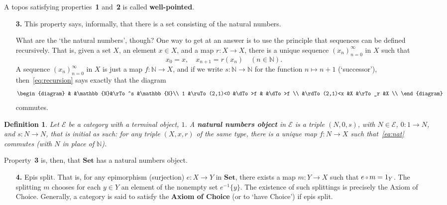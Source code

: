 \documentclass[12pt]{article}
\newcommand{\cat}[1]{\mathscr{#1}}
\newcommand{\fcat}[1]{\mathbf{#1}}
\newcommand{\Set}{\fcat{Set}}
\newcommand{\demph}[1]{\textbf{\textup{#1}}}
\newcommand{\nat}{\mathbb{N}}
\newcommand{\of}{\,\raisebox{0.08ex}{\ensuremath{\scriptstyle\circ}}\,}
\newcommand{\E}{\cat{E}}
\newcommand{\cln}{\colon}
\newtheorem{predefn}[thm]{Definition}
\newenvironment{defn}{\begin{predefn}\upshape}{\end{predefn}}
\begin{document}
A topos satisfying properties~\textbf{1} and~\textbf{2} is called
\demph{well-pointed}.  

\begin{enumerate}
\item[\textbf{3.}] 
This property says, informally, that there is a set consisting of the natural
numbers. 

What are the `the natural numbers', though?  One way to get at an answer is
to use the principle that sequences can be defined recursively.  That is,
given a set $X$, an element $x \in X$, and a map $r\cln X \to X$, there is a
unique sequence $(x_n)_{n = 0}^\infty$ in $X$ such that 
% 
\begin{equation}
\label{eq:recursion}
x_0 = x,
\quad
x_{n + 1} = r(x_n) 
\quad(n \in \nat).
\end{equation}
% 
A sequence $(x_n)_{n = 0}^\infty$ in $X$ is just a map $f\cln \nat \to X$,
and if we write $s\cln \nat \to \nat$ for the function $n \mapsto n + 1$
(`successor'), then~\eqref{eq:recursion} says exactly that the diagram
% 
\begin{equation}
\label{eq:nat}
\begin{diagram}
        &               &\nat   &\rTo^s &\nat   \\
1       &\ruTo(2,1)<0   &\dTo>f &       &\dTo>f \\
        &\rdTo(2,1)<x   &X      &\rTo_r &X      \\
\end{diagram}
\end{equation}
% 
commutes.
\end{enumerate}

\begin{defn}
Let $\E$ be a category with a terminal object, $1$.  A \demph{natural numbers
object} in $\E$ is a triple $(N, 0, s)$, with $N \in \E$, $0\cln 1 \to N$, and
$s\cln N \to N$, that is initial as such: for any triple $(X, x, r)$ of
the same type, there is a unique map $f\cln N \to X$ such that~\eqref{eq:nat}
commutes (with $N$ in place of $\nat$).
\end{defn}

Property~\textbf{3} is, then, that $\Set$ has a natural numbers object.

\begin{enumerate}
\item[\textbf{4.}] 
Epis split.  That is, for any epimorphism (surjection) $e\cln X \to Y$ in
$\Set$, there exists a map $m\cln Y \to X$ such that $e \of m = 1_Y$.  The
splitting $m$ chooses for each $y \in Y$ an element of the nonempty set
$e^{-1}\{y\}$.  The existence of such splittings is precisely the Axiom of
Choice.  Generally, a category is said to satisfy the \demph{Axiom of Choice}
(or to `have Choice') if epis split.
\end{enumerate}
\end{document}
